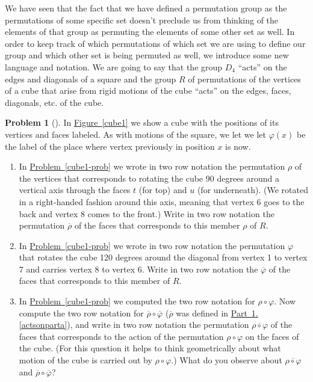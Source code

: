 \documentclass[10pt,]{book}
\theoremstyle{plain}
\theoremstyle{definition}
\newtheorem{activity}[project]{Problem}
\theoremstyle{definition}
\numberwithin{equation}{chapter}
\begin{document}
We have seen that the fact that we have defined a permutation group as the permutations of some specific set doesn't preclude us from thinking of the elements of that group as permuting the elements of some other set as well. In order to keep track of which permutations of which set we are using to define our group and which other set is being permuted as well, we introduce some new language and notation. We are going to say that the group \(D_4\) ``acts'' on the edges and diagonals of a square and the group \(R\) of permutations of the vertices of a cube that arise from rigid motions of the cube ``acts'' on the edges, faces, diagonals, etc. of the cube.%
\begin{activity}[] \label{activity-280}
In \hyperref[cube1]{Figure~\ref{cube1}} we show a cube with the positions of its vertices and faces labeled. As with motions of the square, we let we let \(\varphi(x)\) be the label of the place where vertex previously in position \(x\) is now.%
\begin{enumerate}[font=\bfseries,label=(\alph*),ref=\alph*]
\item\label{actsonparta} \marginsymbol[-2.5em]{} In \hyperref[cube1-prob]{Problem~\ref{cube1-prob}} we wrote in two row notation the permutation \(\rho\) of the vertices that corresponds to rotating the cube 90 degrees around a vertical axis through the faces \(t\) (for top) and \(u\) (for underneath). (We rotated in a right-handed fashion around this axis, meaning that vertex 6 goes to the back and vertex 8 comes to the front.) Write in two row notation the permutation \(\overline{\rho}\) of the faces that corresponds to this member \(\rho\) of \(R\). %
\item\label{task-206} \marginsymbol[-2.5em]{} In \hyperref[cube1-prob]{Problem~\ref{cube1-prob}} we wrote in two row notation the permutation \(\varphi\) that rotates the cube 120 degrees around the diagonal from vertex 1 to vertex 7 and carries vertex 8 to vertex 6.  Write in two row notation the \(\overline{\varphi}\) of the faces that corresponds to this member of \(R\).%
\item\label{cube2} \marginsymbol[-2.5em]{} In \hyperref[cube1-prob]{Problem~\ref{cube1-prob}} we computed the two row notation for \(\rho\circ\varphi\). Now compute the two row notation for \(\overline{\rho}\circ\overline{\varphi}\) (\(\overline{\rho}\) was defined in \hyperref[actsonparta]{Part~\ref{activity-280}.\ref{actsonparta}}), and write in two row notation the permutation \(\overline{\rho\circ\varphi}\) of the faces that corresponds to the action of the permutation \(\rho\circ\varphi\) on the faces of the cube. (For this question it helps to think geometrically about what motion of the cube is carried out by \(\rho\circ\varphi\).)  What do you observe about \(\overline{\rho\circ\varphi}\) and \(\overline{\rho}\circ\overline{\varphi}\)?%
\end{enumerate}
\end{activity}
\end{document}
